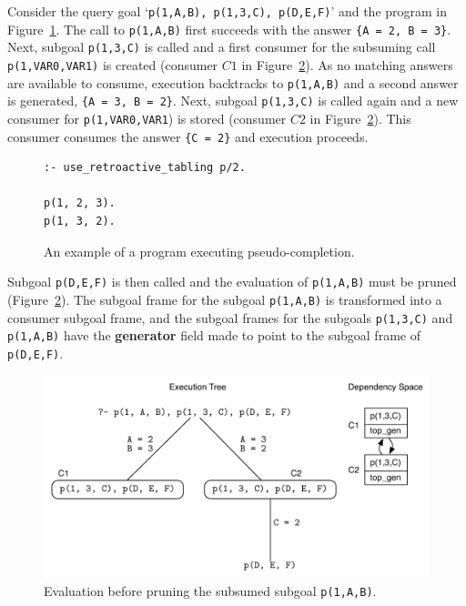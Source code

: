 Consider the query goal `\texttt{p(1,A,B),~p(1,3,C),~p(D,E,F)}' and the program in Figure~\ref{fig:retro_ignored_consumer}.
The call to \texttt{p(1,A,B)} first succeeds with the answer \texttt{\{A~=~2,~B~=~3\}}. Next, subgoal \texttt{p(1,3,C)}
is called and a first consumer for the subsuming call \texttt{p(1,VAR0,VAR1)} is created (consumer $C1$ in
Figure~\ref{fig:retro_pseudo_completion1}). As no matching answers are available to consume, execution
backtracks to \texttt{p(1,A,B)} and a second answer is generated, \texttt{\{A~=~3,~B~=~2\}}. Next,
subgoal \texttt{p(1,3,C)} is called again and a new consumer for \texttt{p(1,VAR0,VAR1}) is stored
(consumer $C2$ in Figure~\ref{fig:retro_pseudo_completion1}).
This consumer consumes the answer \texttt{\{C~=~2\}} and execution proceeds. 

\begin{figure}[ht]
\begin{Verbatim}
:- use_retroactive_tabling p/2.

p(1, 2, 3).
p(1, 3, 2).
\end{Verbatim}
\caption{An example of a program executing pseudo-completion.}
\label{fig:retro_ignored_consumer}
\end{figure}

Subgoal \texttt{p(D,E,F)} is then called and the evaluation of \texttt{p(1,A,B)} must be pruned 
(Figure~\ref{fig:retro_pseudo_completion1}). The subgoal frame for the subgoal \texttt{p(1,A,B)} is
transformed into a consumer subgoal frame, and the subgoal frames for the subgoals \texttt{p(1,3,C)} and
\texttt{p(1,A,B)} have the \textbf{generator} field made to point to the subgoal frame of \texttt{p(D,E,F)}. 

\begin{figure}[ht]
  \centering
    \includegraphics[scale=0.6]{retro_pseudo_completion1.pdf}
  \caption{Evaluation before pruning the subsumed subgoal \texttt{p(1,A,B)}.}
  \label{fig:retro_pseudo_completion1}
\end{figure}

